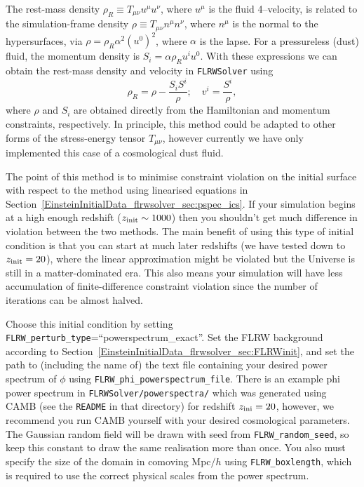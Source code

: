 The rest-mass density $\rho_R\equiv T_{\mu\nu}u^\mu u^\nu$, where $u^\mu$ is the fluid 4--velocity, is related to the simulation-frame density $\rho\equiv T_{\mu\nu}n^\mu n^\nu$, where $n^\mu$ is the normal to the hypersurfaces, via $\rho=\rho_R\alpha^2 (u^0)^2$, where $\alpha$ is the lapse. For a pressureless (dust) fluid, the momentum density is $S_i=\alpha \rho_Ru^i u^0$. With these expressions we can obtain the rest-mass density and velocity in \texttt{FLRWSolver} using
\begin{equation}
	\rho_R = \rho - \frac{S_i S^i}{\rho}; \quad v^i = \frac{S^i}{\rho},
\end{equation}
where $\rho$ and $S_i$ are obtained directly from the Hamiltonian and momentum constraints, respectively. In principle, this method could be adapted to other forms of the stress-energy tensor $T_{\mu\nu}$, however currently we have only implemented this case of a cosmological dust fluid. 

The point of this method is to minimise constraint violation on the initial surface with respect to the method using linearised equations in Section~\ref{EinsteinInitialData_flrwsolver_sec:pspec_ics}. If your simulation begins at a high enough redshift ($z_{\rm init}\sim1000$) then you shouldn't get much difference in violation between the two methods. The main benefit of using this type of initial condition is that you can start at much later redshifts (we have tested down to $z_{\rm init}=20$), where the linear approximation might be violated but the Universe is still in a matter-dominated era. This also means your simulation will have less accumulation of finite-difference constraint violation since the number of iterations can be almost halved. 

Choose this initial condition by setting \texttt{FLRW\_perturb\_type}=``powerspectrum\_exact''. Set the FLRW background according to Section~\ref{EinsteinInitialData_flrwsolver_sec:FLRWinit}, and set the path to (including the name of) the text file containing your desired power spectrum of $\phi$ using \texttt{FLRW\_phi\_powerspectrum\_file}. There is an example phi power spectrum in \texttt{FLRWSolver/powerspectra/} which was generated using CAMB (see the \texttt{README} in that directory) for redshift $z_{\rm ini}=20$, however, we recommend you run CAMB yourself with your desired cosmological parameters.
The Gaussian random field will be drawn with seed from \texttt{FLRW\_random\_seed}, so keep this constant to draw the same realisation more than once. You also must specify the size of the domain in comoving Mpc$/h$ using \texttt{FLRW\_boxlength}, which is required to use the correct physical scales from the power spectrum. 



